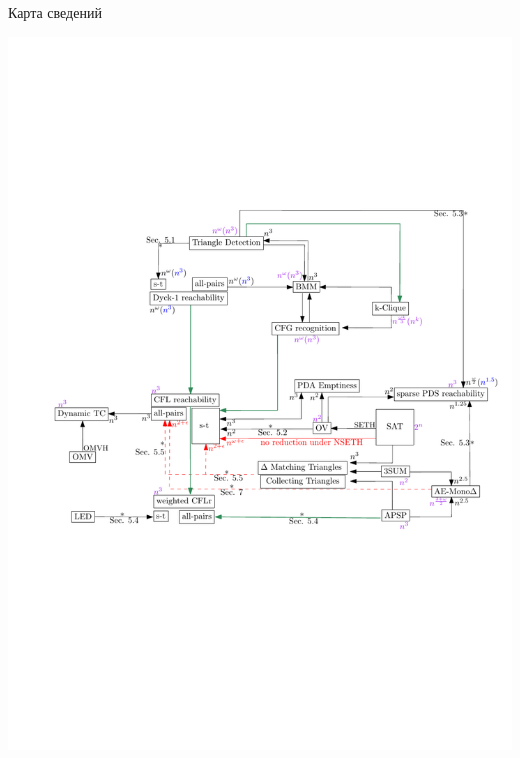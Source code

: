 \documentclass{beamer}
\begin{document}
\begin{frame}{Карта сведений}
	\begin{center}
		\includegraphics[scale=0.58]{./pictures/map_popl_m.pdf}
	\end{center}
\end{frame}
	
\end{document}
